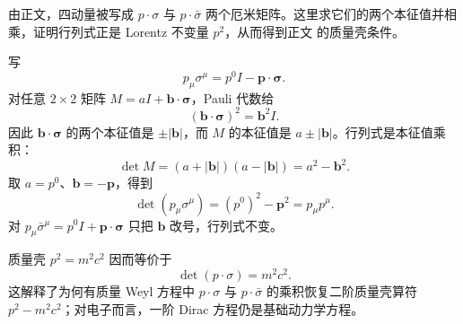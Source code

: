 \begin{derivation}

由正文，四动量被写成 $p\cdot\sigma$ 与 $p\cdot\bar\sigma$ 两个厄米矩阵。这里求它们的两个本征值并相乘，证明行列式正是 Lorentz 不变量 $p^2$，从而得到正文 的质量壳条件。



写
\begin{equation*}
 p_\mu\sigma^\mu=p^0I-\mathbf p\cdot\boldsymbol\sigma.
\end{equation*}
对任意 $2\times2$ 矩阵 $M=aI+\mathbf b\cdot\boldsymbol\sigma$，Pauli 代数给
\begin{equation*}
 (\mathbf b\cdot\boldsymbol\sigma)^2=\mathbf b^2I.
\end{equation*}
因此 $\mathbf b\cdot\boldsymbol\sigma$ 的两个本征值是 $\pm|\mathbf b|$，而 $M$ 的本征值是 $a\pm|\mathbf b|$。行列式是本征值乘积：
\begin{equation*}
 \det M=(a+|\mathbf b|)(a-|\mathbf b|)=a^2-\mathbf b^2.
\end{equation*}
取 $a=p^0$、$\mathbf b=-\mathbf p$，得到
\begin{equation*}
 \det(p_\mu\sigma^\mu)
 =(p^0)^2-\mathbf p^2=p_\mu p^\mu.
\end{equation*}
对 $p_\mu\bar\sigma^\mu=p^0I+\mathbf p\cdot\boldsymbol\sigma$ 只把 $\mathbf b$ 改号，行列式不变。

质量壳 $p^2=m^2c^2$ 因而等价于
\begin{equation*}
 \det(p\cdot\sigma)=m^2c^2.
\end{equation*}
这解释了为何有质量 Weyl 方程中 $p\cdot\sigma$ 与 $p\cdot\bar\sigma$ 的乘积恢复二阶质量壳算符 $p^2-m^2c^2$；对电子而言，一阶 Dirac 方程仍是基础动力学方程。
\end{derivation}


